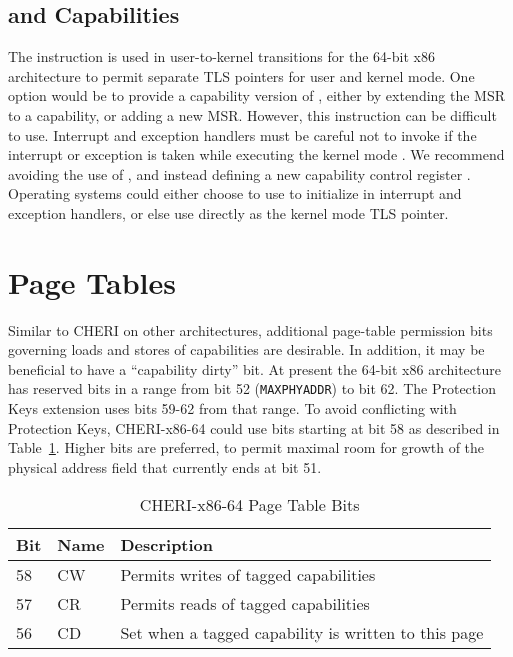 \subsection{ and Capabilities}

The  instruction is used in user-to-kernel
transitions for the 64-bit x86 architecture to permit separate TLS
pointers for user and kernel mode.  One option would be to provide a
capability version of , either by extending the
\KGSBASE{} MSR to a capability, or adding a new MSR.  However, this
instruction can be difficult to use.  Interrupt and exception handlers
must be careful not to invoke  if the interrupt
or exception is taken while executing the kernel mode \GS{}.  We
recommend avoiding the use of , and instead defining
a new capability control register \KGS{}.  Operating systems could
either choose to use \KGS{} to initialize \CGS{} in interrupt and
exception handlers, or else use \KGS{} directly as the kernel mode TLS
pointer.

\section{Page Tables}

Similar to CHERI on other architectures, additional page-table
permission bits governing loads and stores of capabilities are
desirable.  In addition, it may be beneficial to have a ``capability
dirty'' bit.  At present the 64-bit x86 architecture has reserved bits
in a range from bit 52 (\texttt{MAXPHYADDR}) to bit 62.  The Protection Keys
extension uses bits 59-62 from that range.  To avoid conflicting with
Protection Keys, CHERI-x86-64 could use bits starting at bit 58 as described in Table~\ref{table:x86:pte}.  Higher bits are
preferred, to permit maximal room for growth of the physical address
field that currently ends at bit 51.

\begin{table}
\begin{center}
\begin{tabular}{lll}
\toprule
Bit & Name & Description \\
\midrule
58 & CW & Permits writes of tagged capabilities \\
57 & CR & Permits reads of tagged capabilities \\
56 & CD & Set when a tagged capability is written to this page \\
\bottomrule
\end{tabular}
\end{center}
\caption{CHERI-x86-64 Page Table Bits}
\label{table:x86:pte}
\end{table}

